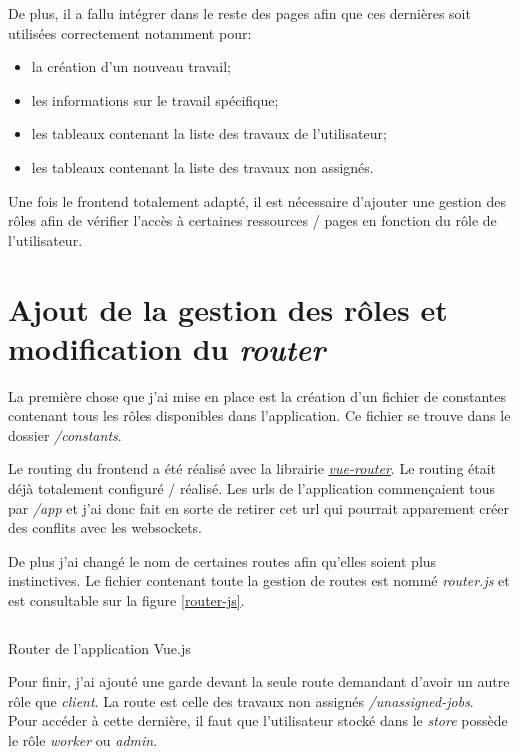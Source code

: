 \documentclass[
    iai, %
    il, %
]{heig-tb}
\begin{document}
De plus, il a fallu intégrer dans le reste des pages afin que ces dernières soit utilisées correctement notamment pour:
\begin{itemize}
    \item la création d'un nouveau travail;
    \item les informations sur le travail spécifique;
    \item les tableaux contenant la liste des travaux de l'utilisateur;
    \item les tableaux contenant la liste des travaux non assignés.
\end{itemize}

Une fois le \Gls{frontend} totalement adapté, il est nécessaire d'ajouter une gestion des rôles afin de vérifier l'accès à certaines ressources / pages en fonction du rôle de l'utilisateur.

\section{Ajout de la gestion des rôles et modification du \emph{router}}
La première chose que j'ai mise en place est la création d'un fichier de constantes contenant tous les rôles disponibles dans l'application. Ce fichier se trouve dans le dossier \emph{/constants}.

Le routing du \Gls{frontend} a été réalisé avec la librairie \href{https://router.vuejs.org/}{\emph{vue-router}}. Le routing était déjà totalement configuré / réalisé. Les \Gls{url}s de l'application commençaient tous par \emph{/app} et j'ai donc fait en sorte de retirer cet \Gls{url} qui pourrait apparement créer des conflits avec les \Gls{websockets}.

De plus j'ai changé le nom de certaines routes afin qu'elles soient plus instinctives. Le fichier contenant toute la gestion de routes est nommé \emph{router.js} et est consultable sur la figure \ref{router-js}.

\begin{listing}[h]
    \inputminted{javascript}{assets/code/router.js}
    \caption{Router de l'application Vue.js \label{router-js}}
\end{listing}

Pour finir, j'ai ajouté une garde devant la seule route demandant d'avoir un autre rôle que \emph{client}. La route est celle des travaux non assignés \emph{/unassigned-jobs}. \\
Pour accéder à cette dernière, il faut que l'utilisateur stocké dans le \emph{store} possède le rôle \emph{worker} ou \emph{admin}.
\end{document}
